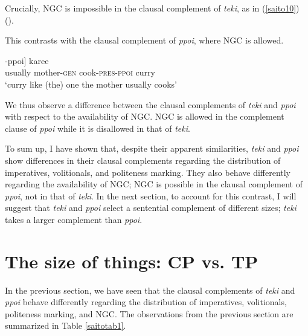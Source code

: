 \documentclass[output=paper]{langscibook}
\begin{document}
Crucially, NGC is impossible in the clausal complement of \emph{teki}, as in (\ref{saito10}) (\citealt{Saito2017}).

\begin{exe}
\end{exe}

This contrasts with the clausal complement of \emph{ppoi}, where NGC is allowed.

\begin{exe}
\ex \label{saito11}
\gll [[{hudan} {okaasan-no} {tuku-ru}]-{ppoi}] {karee}\\
usually mother-\textsc{gen} cook-\textsc{pres-ppoi} curry\\ 
\glt ‘curry like (the) one the mother usually cooks’
\end{exe}

We thus observe a difference between the clausal complements of \emph{teki} and \emph{ppoi} with respect to the availability of NGC. NGC is allowed in the complement clause of \emph{ppoi} while it is disallowed in that of \emph{teki}.

To sum up, I have shown that, despite their apparent similarities, \emph{teki} and \emph{ppoi} show differences in their clausal complements regarding the distribution of imperatives, volitionals, and politeness marking. They also behave differently regarding the availability of NGC; NGC is possible in the clausal complement of \emph{ppoi}, not in that of \emph{teki}. In the next section, to account for this contrast, I will suggest that \emph{teki} and \emph{ppoi} select a sentential complement of different sizes; \emph{teki} takes a larger complement than \emph{ppoi}.

\section{The size of things: CP vs. TP} \label{saitos3}

In the previous section, we have seen that the clausal complements of \emph{teki} and \emph{ppoi} behave differently regarding the distribution of imperatives, volitionals, politeness marking, and NGC. The observations from the previous section are summarized in Table \ref{saitotab1}.
\end{document}
